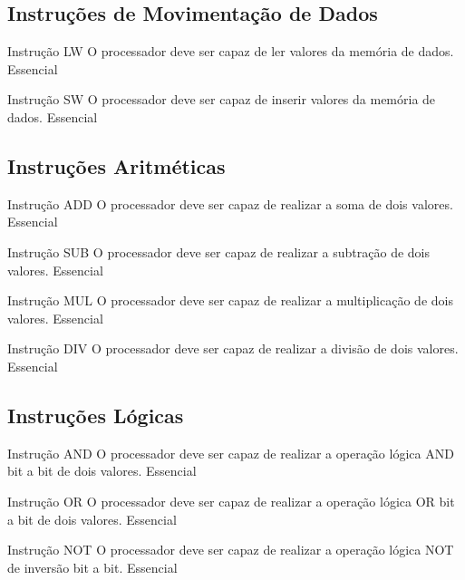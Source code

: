 \documentclass{article}
\begin{document}
  \subsection{Instruções de Movimentação de Dados}
    \begin{functional}
     \requirement
      {Instrução LW}
      {O processador deve ser capaz de ler valores da memória de dados.}
      {Essencial}
    
     \requirement
      {Instrução SW}
      {O processador deve ser capaz de inserir valores da memória de dados.}
      {Essencial}
    \end{functional}
    
    \subsection{Instruções Aritméticas}
    \begin{functional}
    
     \requirement
      {Instrução ADD}
      {O processador deve ser capaz de realizar a soma de dois valores.}
      {Essencial}
    
     \requirement
      {Instrução SUB}
      {O processador deve ser capaz de realizar a subtração de dois valores.}
      {Essencial}
      
      \requirement
      {Instrução MUL}
      {O processador deve ser capaz de realizar a multiplicação de dois valores.}
      {Essencial}
      
       \requirement
      {Instrução DIV}
      {O processador deve ser capaz de realizar a divisão de dois valores.}
      {Essencial}
      
     
      
    \end{functional}

  \subsection{Instruções Lógicas}
  
    \begin{functional}
      \requirement
      {Instrução AND}
      {O processador deve ser capaz de realizar a operação lógica AND bit a bit de dois valores.}
      {Essencial}

      \requirement
      {Instrução OR}
      {O processador deve ser capaz de realizar a operação lógica OR bit a bit de dois valores.}
      {Essencial}
      
      \requirement
      {Instrução NOT}
      {O processador deve ser capaz de realizar a operação lógica NOT de inversão bit a bit.}
      {Essencial}

    \end{functional}    
    
\end{document}
